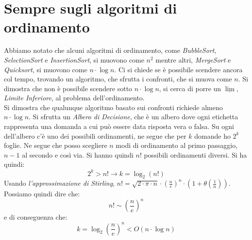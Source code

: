 \documentclass[a4paper,12pt,oneside,tikz]{book}
\begin{document}
\section{Sempre sugli algoritmi di ordinamento}
Abbiamo notato che alcuni algoritmi di ordinamento, come \textit{BubbleSort}, \textit{SelectionSort} e \textit{InsertionSort}, si muovono come $n^2$ mentre altri, \textit{MergeSort} e \textit{Quicksort}, si muovono come $n\cdot \log n$. Ci si chiede se è possibile scendere ancora col tempo, trovando un algoritmo, che sfrutta i confronti, che si muova come $n$. Si dimostra che non è possibile scendere sotto $n\cdot \log n$, si cerca di porre un $\underline{\lim}$, \textit{Limite Inferiore}, al problema dell'ordinamento. \\
Si dimostra che qualunque algoritmo basato sui confronti richiede almeno $n\cdot\log n$. Si sfrutta un \textit{Albero di Decisione}, che è un albero dove ogni etichetta rappresenta una domanda a cui può essere data risposta vera o falsa.
Su ogni dell'albero c'è uno dei possibili ordinamenti, ne segue che per $k$ domande ho $2^k$ foglie. Ne segue che posso scegliere $n$ modi di ordinamento al primo passaggio, $n-1$ al secondo e così via. Si hanno quindi $n!$ possibili ordinamenti diversi. Si ha quindi:
$$2^k>n!\longrightarrow k=\log_2 (n!)$$
Usando \textit{l'approssimazione di Stirling}, $n!=\sqrt{2\cdot \pi\cdot n}\cdot \left(\frac{n}{e}\right)^n\cdot\left(1+\theta\left(\frac{1}{n}\right)\right)$. \\Possiamo quindi dire che:
$$n!\sim \left(\frac{n}{e}\right)^n$$
e di conseguenza che:
$$k=\log_2\left(\frac{n}{e}\right)^n<O(n\cdot \log n)$$
\end{document}
